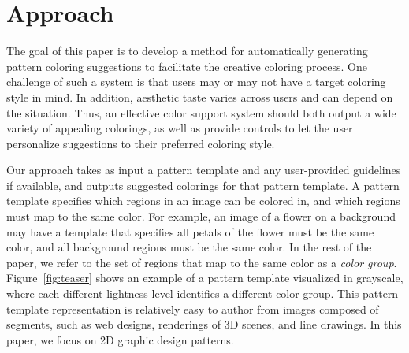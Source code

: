 \section{Approach}
\label{sec:approach}


The goal of this paper is to develop a method for automatically generating pattern coloring suggestions to facilitate the creative coloring process. One challenge of such a system is that users may or may not have a target coloring style in mind. In addition, aesthetic taste varies across users and can depend on the situation. Thus, an effective color support system should both output a wide variety of appealing colorings, as well as provide controls to let the user personalize suggestions to their preferred coloring style.


Our approach takes as input a pattern template and any user-provided guidelines if available, and outputs suggested colorings for that pattern template. A pattern template specifies which regions in an image can be colored in, and which regions must map to the same color. For example, an image of a flower on a background may have a template that specifies all petals of the flower must be the same color, and all background regions must be the same color. In the rest of the paper, we refer to the set of regions that map to the same color as a \emph{color group}. Figure~\ref{fig:teaser} shows an example of a pattern template visualized in grayscale, where each different lightness level identifies a different color group. This pattern template representation is relatively easy to author from images composed of segments, such as web designs, renderings of 3D scenes, and line drawings. In this paper, we focus on 2D graphic design patterns. 

